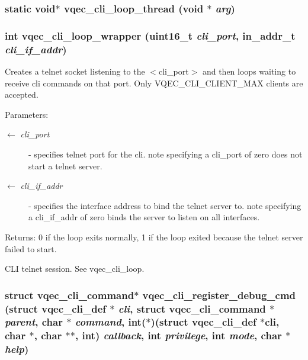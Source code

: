 \subsubsection{\setlength{\rightskip}{0pt plus 5cm}static void$\ast$ vqec\_\-cli\_\-loop\_\-thread (void $\ast$ {\em arg})\hspace{0.3cm}{\tt  [static]}}\label{vqec__cli__register_8c_59688ec9546df1d34fe1e02f974acfeb}


\subsubsection{\setlength{\rightskip}{0pt plus 5cm}int vqec\_\-cli\_\-loop\_\-wrapper (uint16\_\-t {\em cli\_\-port}, in\_\-addr\_\-t {\em cli\_\-if\_\-addr})}\label{vqec__cli__register_8c_c633b1929d242adb624a6b087aca273b}


Creates a telnet socket listening to the $<$cli\_\-port$>$ and then loops waiting to receive cli commands on that port. Only VQEC\_\-CLI\_\-CLIENT\_\-MAX clients are accepted. \begin{Desc}
\item[Parameters:]
\begin{description}
\item[\mbox{$\leftarrow$} {\em cli\_\-port}]- specifies telnet port for the cli. note specifying a cli\_\-port of zero does not start a telnet server. \item[\mbox{$\leftarrow$} {\em cli\_\-if\_\-addr}]- specifies the interface address to bind the telnet server to. note specifying a cli\_\-if\_\-addr of zero binds the server to listen on all interfaces. \end{description}
\end{Desc}
\begin{Desc}
\item[Returns:]0 if the loop exits normally, 1 if the loop exited because the telnet server failed to start.\end{Desc}
CLI telnet session. See vqec\_\-cli\_\-loop. 
\subsubsection{\setlength{\rightskip}{0pt plus 5cm}struct \bf{vqec\_\-cli\_\-command}$\ast$ vqec\_\-cli\_\-register\_\-debug\_\-cmd (struct \bf{vqec\_\-cli\_\-def} $\ast$ {\em cli}, struct \bf{vqec\_\-cli\_\-command} $\ast$ {\em parent}, char $\ast$ {\em command}, int($\ast$)(struct \bf{vqec\_\-cli\_\-def} $\ast$cli, char $\ast$, char $\ast$$\ast$, int) {\em callback}, int {\em privilege}, int {\em mode}, char $\ast$ {\em help})}\label{vqec__cli__register_8c_9a65f558da2216192a635d03246b30a8}


